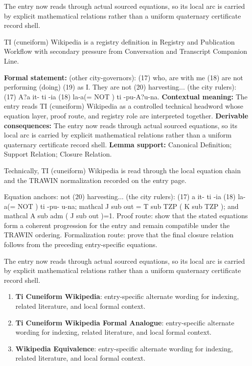The entry now reads through actual sourced equations, so its local arc is carried by explicit mathematical relations rather than a uniform quaternary certificate record shell.
\clearpage


\begingroup\small
{}
TI (cuneiform) Wikipedia is a registry definition in Registry and Publication Workflow with secondary pressure from Conversation and Transcript Companion Line.

\begingroup\footnotesize\setlength{\emergencystretch}{3em}\sloppy
\textbf{Formal statement:} (other city-governors): (17) who, are with me (18) are not performing (doing) (19) as I. They are not (20) harvesting... (the city rulers): (17) A?a it- ti -ia (18) la-a(= NOT ) ti -pu-A?u-na. \textbf{Contextual meaning:} The entry reads TI (cuneiform) Wikipedia as a controlled technical headword whose equation layer, proof route, and registry role are interpreted together. \textbf{Derivable consequences:} The entry now reads through actual sourced equations, so its local arc is carried by explicit mathematical relations rather than a uniform quaternary certificate record shell. \textbf{Lemma support:} Canonical Definition; Support Relation; Closure Relation.\par
\endgroup

Technically, TI (cuneiform) Wikipedia is read through the local equation chain and the TRAWIN normalization recorded on the entry page.

Equation anchors: not (20) harvesting... (the city rulers): (17)   a it- ti -ia (18) la-a(= NOT ) ti -pu-  u-na; mathcal J sub out = T sub TZP ( K sub TZP ); and mathcal A sub adm ( J sub out )=1. Proof route: show that the stated equations form a coherent progression for the entry and remain compatible under the TRAWIN ordering. Formalization route: prove that the final closure relation follows from the preceding entry-specific equations.

The entry now reads through actual sourced equations, so its local arc is carried by explicit mathematical relations rather than a uniform quaternary certificate record shell.
\endgroup

\begin{enumerate}[leftmargin=1.6em,itemsep=6pt,topsep=4pt]
\item \textbf{Ti Cuneiform Wikipedia}: entry-specific alternate wording for indexing, related literature, and local formal context.
\item \textbf{Ti Cuneiform Wikipedia Formal Analogue}: entry-specific alternate wording for indexing, related literature, and local formal context.
\item \textbf{Wikipedia Equivalence}: entry-specific alternate wording for indexing, related literature, and local formal context.
\end{enumerate}

